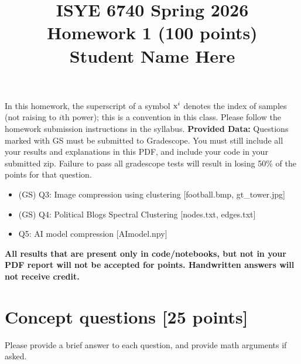 \documentclass[twoside,10pt]{article}
\begin{document}
\title{ISYE 6740 Spring 2026\\ Homework 1 (100 points)\\Student Name Here}

\date{}

\maketitle

\vspace{-.5in}

In this homework, the superscript of a symbol $\text x^i$ denotes the index of samples (not raising to $i$th power); this is a convention in this class. Please follow the homework submission instructions in the syllabus.
\newline
\newline
\textbf{Provided Data:}
Questions marked with GS must be submitted to Gradescope. You must still include all your results and explanations in this PDF, and include your code in your submitted zip. Failure to pass all gradescope tests will result in losing 50\% of the points for that question.
\begin{itemize}
    \item (GS) Q3: Image compression using clustering [football.bmp, gt\_tower.jpg]
    \item (GS) Q4: Political Blogs Spectral Clustering [nodes.txt, edges.txt]
    \item Q5: AI model compression [AImodel.npy]
\end{itemize}

\leavevmode\newline
\textbf{All results that are present only in code/notebooks, but not in your PDF report will not be accepted for points. Handwritten answers will not receive credit.}


\section{Concept questions [25 points]}

Please provide a brief answer to each question, and provide math arguments if asked. 
\end{document}
